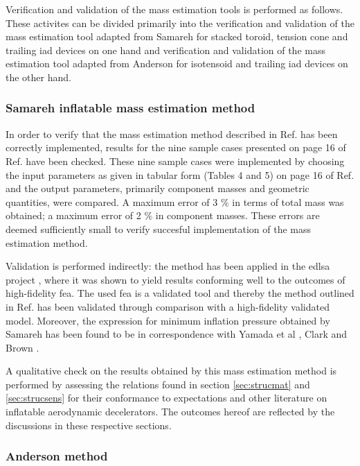 Verification and validation of the mass estimation tools is performed as follows. These activites can be divided primarily into the verification and validation of the mass estimation tool adapted from Samareh \cite{Samareh2011} for stacked toroid, tension cone and trailing \gls{iad} devices on one hand and verification and validation of the mass estimation tool adapted from Anderson \cite{Anderson1969} for isotensoid and trailing \gls{iad} devices on the other hand. 

\subsubsection{Samareh inflatable mass estimation method}
In order to verify that the mass estimation method described in Ref.\cite{Samareh2011} has been correctly implemented, results for the nine sample cases presented on page 16 of Ref.\cite{Samareh2011} have been checked. These nine sample cases were implemented by choosing the input parameters as given in tabular form (Tables 4 and 5) on page 16 of Ref.\cite{Samareh2011} and the output parameters, primarily component masses and geometric quantities, were compared. A maximum error of 3 $\%$ in terms of total mass was obtained; a maximum error of 2 $\%$ in component masses. These errors are deemed sufficiently small to verify succesful implementation of the mass estimation method.

Validation is performed indirectly: the method \cite{Samareh2011} has been applied in the \gls{edlsa} project \cite{Cianciolo2010}, where it was shown to yield results conforming well to the outcomes of high-fidelity \gls{fea}. The used \gls{fea} is a validated tool \cite{Cianciolo2010} and thereby the method outlined in Ref.\cite{Samareh2011} has been validated through comparison with a high-fidelity validated model. Moreover, the expression for minimum inflation pressure obtained by Samareh has been found to be in correspondence with Yamada et al \cite{Yamada2009}, Clark \cite{Clark2009} and Brown \cite{Brown2009}.

A qualitative check on the results obtained by this mass estimation method is performed by assessing the relations found in section \ref{sec:strucmat} and \ref{sec:strucsens} for their conformance to expectations and other literature on inflatable aerodynamic decelerators. The outcomes hereof are reflected by the discussions in these respective sections.

\subsubsection{Anderson method}


